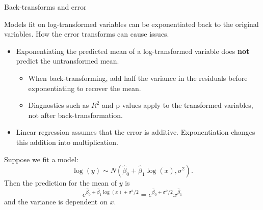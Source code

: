 \documentclass[
  ignorenonframetext,
]{beamer}
\providecommand{\tightlist}{%
  \setlength{\itemsep}{0pt}\setlength{\parskip}{0pt}}
\begin{document}
\begin{frame}{Back-transforms and error}
\protect\hypertarget{back-transforms-and-error}{}

Models fit on log-transformed variables can be exponentiated back to the
original variables. How the error transforms can cause issues.

\begin{itemize}
\tightlist
\item
  Exponentiating the predicted mean of a log-transformed variable does
  \textbf{not} predict the untransformed mean.

  \begin{itemize}
  \tightlist
  \item
    When back-transforming, add half the variance in the residuals
    before exponentiating to recover the mean.
  \item
    Diagnostics such as \(R^2\) and p values apply to the transformed
    variables, not after back-transformation.
  \end{itemize}
\item
  Linear regression assumes that the error is additive. Exponentiation
  changes this addition into multiplication.
\end{itemize}

Suppose we fit a model: \[
\log(y)\sim N\left(\hat\beta_0+\hat\beta_1\log(x), \sigma^2\right).
\] Then the prediction for the mean of \(y\) is \[
e^{\hat\beta_0+\hat\beta_1\log(x)+\sigma^2/2}=e^{\hat\beta_0+\sigma^2/2}x^{\hat\beta_1}
\] and the variance is dependent on \(x\).

\end{frame}
\end{document}

